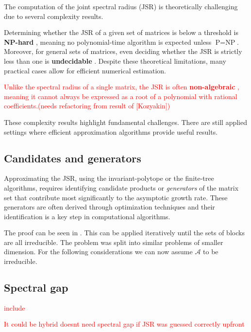 The computation of the joint spectral radius (JSR) is theoretically challenging due to several complexity results.

Determining whether the JSR of a given set of matrices is below a threshold is \textbf{NP-hard} \citep{tsitsiklis1997lyapunov}, meaning no polynomial-time algorithm is expected unless $\text{P} = \text{NP}$. Moreover, for general sets of matrices, even deciding whether the JSR is strictly less than one is \textbf{undecidable} \citep{blondel2000boundedness}. Despite these theoretical limitations, many practical cases allow for efficient numerical estimation.

\textcolor{red}{Unlike the spectral radius of a single matrix, the JSR is often \textbf{non-algebraic} \citep{guglielmiExactComputationJoint2011}, meaning it cannot always be expressed as a root of a polynomial with rational coefficients.(needs refactoring from result of [Kozyakin])}

These complexity results highlight fundamental challenges. There are still applied settings where efficient approximation algorithms provide useful results.

\subsection*{Candidates and generators}
Approximating the JSR, using the invariant-polytope or the finite-tree algorithms, requires identifying candidate products or \emph{generators} of the matrix set that contribute most significantly to the asymptotic growth rate. These generators are often derived through optimization techniques and their identification is a key step in computational algorithms.
 
The proof can be seen in \citep{jungersJointSpectralRadius2009}.
This can be applied iteratively until the sets of blocks are all irreducible.
The problem was split into similar problems of smaller dimension.
For the following considerations we can now assume $\mathcal{A}$ to be irreducible.

\subsection*{Spectral gap}
\begin{definition}
\textcolor{red}{include}
\end{definition}

\begin{remark}
    \textcolor{red}{It could be hybrid doesnt need spectral gap if JSR was guessed correctly upfront}
\end{remark}

